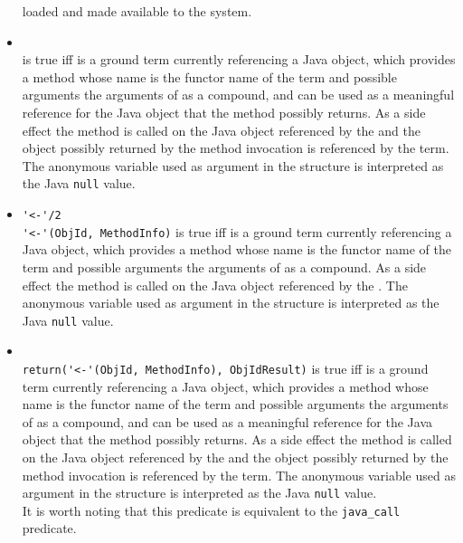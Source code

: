\begin{itemize}
loaded and made available to the system.\\
%
\item {}\\
\noindent{} is true iff
 is a ground term currently referencing a Java object,
which provides a method whose name is the functor name of the term
 and possible arguments the arguments of
 as a compound, and  can be used as
a meaningful reference for the Java object that the method
possibly returns.
%
As a side effect the method is called on the Java object
referenced by the  and the object possibly returned by
the method invocation is referenced by the  term.
%
The anonymous variable used as argument in the 
structure is interpreted as the Java \texttt{null} value.\\
%
\item \verb|'<-'/2|\\
\noindent\verb|'<-'(ObjId, MethodInfo)| is true iff  is
a ground term currently referencing a Java object, which provides a
method whose name is the functor name of the term 
and possible arguments the arguments of  as a
compound.
%
As a side effect the method is called on the Java object
referenced by the .
%
The anonymous variable used as argument in the 
structure is interpreted as the Java \texttt{null} value.\\
%
\item {}\\
\noindent\verb|return('<-'(ObjId, MethodInfo), ObjIdResult)| is true
iff  is a ground term currently referencing a Java object,
which provides a method whose name is the functor name of the term
 and possible arguments the arguments of
 as a compound, and  can be used as
a meaningful reference for the Java object that the method
possibly returns.
%
As a side effect the method is called on the Java object
referenced by the  and the object possibly returned by
the method invocation is referenced by the  term.
%
The anonymous variable used as argument in the 
structure is interpreted as the Java \texttt{null} value.\\
%
It is worth noting that this predicate is equivalent to the
\texttt{java\_call} predicate.\\
%
\end{itemize}

